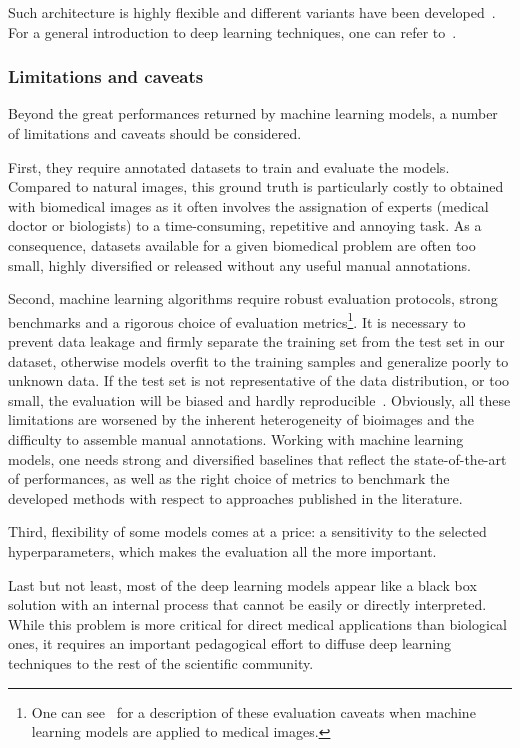 Such architecture is highly flexible and different variants have been developed~\cite{lecun_deep_2015}.
For a general introduction to deep learning techniques, one can refer to~\cite{Goodfellow_2016}.

\subsubsection{Limitations and caveats}

Beyond the great performances returned by machine learning models, a number of limitations and caveats should be considered.

First, they require annotated datasets to train and evaluate the models.
Compared to natural images, this ground truth is particularly costly to obtained with biomedical images as it often involves the assignation of experts (medical doctor or biologists) to a time-consuming, repetitive and annoying task.
As a consequence, datasets available for a given biomedical problem are often too small, highly diversified or released without any useful manual annotations.

Second, machine learning algorithms require robust evaluation protocols, strong benchmarks and a rigorous choice of evaluation metrics\footnote{One can see~\cite{varoquaux_machine_2022} for a description of these evaluation caveats when machine learning models are applied to medical images.}.
It is necessary to prevent data leakage and firmly separate the training set from the test set in our dataset, otherwise models overfit to the training samples and generalize poorly to unknown data.
If the test set is not representative of the data distribution, or too small, the evaluation will be biased and hardly reproducible~\cite{Varoquaux_cv_2018}.
Obviously, all these limitations are worsened by the inherent heterogeneity of bioimages and the difficulty to assemble manual annotations.
Working with machine learning models, one needs strong and diversified baselines that reflect the state-of-the-art of performances, as well as the right choice of metrics to benchmark the developed methods with respect to approaches published in the literature.

Third, flexibility of some models comes at a price: a sensitivity to the selected hyperparameters, which makes the evaluation all the more important.

Last but not least, most of the deep learning models appear like a black box solution with an internal process that cannot be easily or directly interpreted.
While this problem is more critical for direct medical applications than biological ones, it requires an important pedagogical effort to diffuse deep learning techniques to the rest of the scientific community.


